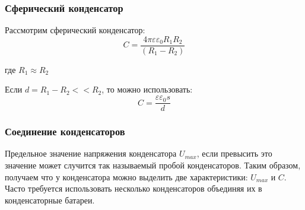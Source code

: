 \documentclass[../main.tex]{subfiles}
\begin{document}
\subsubsection{Сферический конденсатор}
Рассмотрим сферический конденсатор:
\[C = \frac{4 \pi \varepsilon \varepsilon_0 R_1 R_2}{(R_1 - R_2)}\]
\begin{center}
    где $R_1 \approx R_2$
\end{center}
Если $d = R_1 -R_2 << R_2$, то можно использовать:
\[C = \frac{\varepsilon \varepsilon_0 s}{d}\]

\subsubsection{Соединение конденсаторов}

Предельное значение напряжения конденсатора $U_{max}$, если превысить это значение может случится так называемый пробой конденсаторов.
Таким образом, получаем что у конденсатора можно выделить две характеристики: $U_{max}$ и $C$. Часто требуется использовать несколько
конденсаторов объединяя их в конденсаторные батареи.
\end{document}

